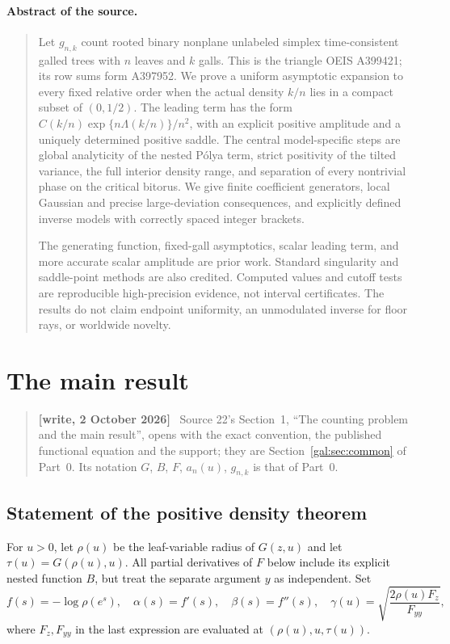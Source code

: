 \documentclass[11pt,letterpaper]{article}
\numberwithin{equation}{section}
\theoremstyle{definition}\newtheorem{definition}[theorem]{Definition}
\theoremstyle{remark}\newtheorem{remark}[theorem]{Remark}
\newenvironment{writenote}{\par\smallskip\begin{quote}\small\textbf{[write, 2 October 2026]}\ }{\end{quote}\smallskip}
\begin{document}
\paragraph{Abstract of the source.}
\begin{quote}\small
Let $g_{n,k}$ count rooted binary nonplane unlabeled simplex time-consistent galled trees with $n$ leaves and $k$ galls. This is the triangle OEIS A399421; its row sums form A397952. We prove a uniform asymptotic expansion to every fixed relative order when the actual density $k/n$ lies in a compact subset of $(0,1/2)$. The leading term has the form $C(k/n)\exp\{n\Lambda(k/n)\}/n^2$, with an explicit positive amplitude and a uniquely determined positive saddle. The central model-specific steps are global analyticity of the nested P\'olya term, strict positivity of the tilted variance, the full interior density range, and separation of every nontrivial phase on the critical bitorus. We give finite coefficient generators, local Gaussian and precise large-deviation consequences, and explicitly defined inverse models with correctly spaced integer brackets.

The generating function, fixed-gall asymptotics, scalar leading term, and more accurate scalar amplitude are prior work. Standard singularity and saddle-point methods are also credited. Computed values and cutoff tests are reproducible high-precision evidence, not interval certificates. The results do not claim endpoint uniformity, an unmodulated inverse for floor rays, or worldwide novelty.
\end{quote}

\section{The main result}\label{gal:dn:sec:statement}
\begin{writenote}
Source 22's Section~1, ``The counting problem and the main result'', opens with the exact convention, the published functional equation and the support; they are Section~\ref{gal:sec:common} of Part~0. Its notation $G$, $B$, $F$, $a_n(u)$, $g_{n,k}$ is that of Part~0.
\end{writenote}
\subsection{Statement of the positive density theorem}
For $u>0$, let $\rho(u)$ be the leaf-variable radius of $G(z,u)$ and let $\tau(u)=G(\rho(u),u)$. All partial derivatives of $F$ below include its explicit nested function $B$, but treat the separate argument $y$ as independent. Set
\begin{equation}\label{gal:dn:eq:fgamma}
 f(s)=-\log\rho(e^s),\quad \alpha(s)=f'(s),\quad \beta(s)=f''(s),\quad
 \gamma(u)=\sqrt{\frac{2\rho(u)F_z}{F_{yy}}},
\end{equation}
where $F_z,F_{yy}$ in the last expression are evaluated at $(\rho(u),u,\tau(u))$.
\end{document}
